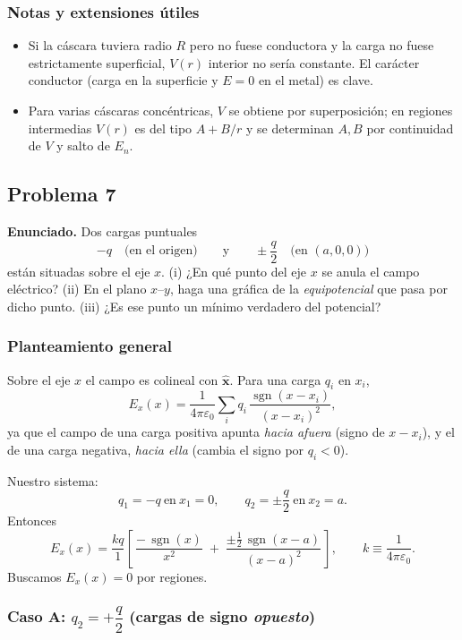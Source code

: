 \documentclass{article}
\begin{document}
\subsubsection*{Notas y extensiones útiles}
\begin{itemize}
\item Si la cáscara tuviera radio $R$ pero no fuese conductora y la carga no fuese estrictamente superficial, $V(r)$ interior no sería constante. El carácter conductor (carga en la superficie y $E=0$ en el metal) es clave.
\item Para varias cáscaras concéntricas, $V$ se obtiene por superposición; en regiones intermedias $V(r)$ es del tipo $A+B/r$ y se determinan $A,B$ por continuidad de $V$ y salto de $E_n$.
\end{itemize}


\subsection{Problema 7} \vspace{0.5cm}

\textbf{Enunciado.} Dos cargas puntuales
\[
-q \quad \text{(en el origen)} \qquad \text{y} \qquad \pm \frac{q}{2} \quad \text{(en } (a,0,0)\text{)}
\]
están situadas sobre el eje $x$. (i) ¿En qué punto del eje $x$ se anula el campo eléctrico? (ii) En el plano $x$–$y$, haga una gráfica de la \emph{equipotencial} que pasa por dicho punto. (iii) ¿Es ese punto un mínimo verdadero del potencial?

\subsubsection*{Planteamiento general}
Sobre el eje $x$ el campo es colineal con $\hat{\mathbf x}$. Para una carga $q_i$ en $x_i$,
\[
E_x(x)=\frac{1}{4\pi\varepsilon_0}\sum_i q_i\,\frac{\operatorname{sgn}(x-x_i)}{(x-x_i)^2},
\]
ya que el campo de una carga positiva apunta \emph{hacia afuera} (signo de $x-x_i$), y el de una carga negativa, \emph{hacia ella} (cambia el signo por $q_i<0$).

Nuestro sistema:
\[
q_1=-q \ \text{en}\ x_1=0,\qquad q_2=\pm \frac{q}{2}\ \text{en}\ x_2=a.
\]
Entonces
\[
E_x(x)=\frac{k q}{1}\left[\,\frac{-\,\operatorname{sgn}(x)}{x^2}\;+\;\frac{\pm \tfrac12\,\operatorname{sgn}(x-a)}{(x-a)^2}\,\right],
\qquad k\equiv \frac{1}{4\pi\varepsilon_0}.
\]
Buscamos $E_x(x)=0$ por regiones.

\subsubsection*{Caso A: $q_2=+\dfrac{q}{2}$ (cargas de signo \emph{opuesto})}
\end{document}
